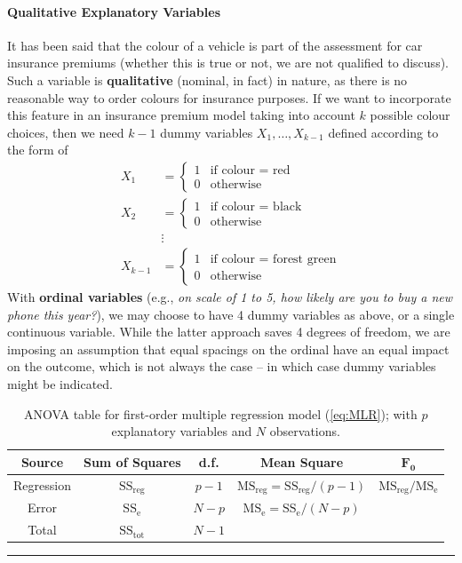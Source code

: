 \paragraph{Qualitative Explanatory Variables}
It has been said that the colour of a vehicle is part of the assessment for car insurance premiums (whether this is true or not, we are not qualified to discuss). Such a variable is \textbf{qualitative} (nominal, in fact) in nature, as there is no reasonable way to order colours for insurance purposes. If we want to incorporate this feature in an insurance premium model taking into account $k$ possible colour choices, then we need $k-1$ dummy variables $X_1,\ldots,X_{k-1}$ defined according to  the form of
\begin{align*}
    X_{1} &= 
    \begin{cases}
    1 & \text{if colour $=$ red}\\
    0 & \text{otherwise}
    \end{cases}\\
    X_{2} &= 
    \begin{cases}
    1 & \text{if colour $=$ black}\\
    0 & \text{otherwise}
    \end{cases}\\
    & \vdots\\
    X_{k-1} &= 
    \begin{cases}
    1 & \text{if colour $=$ forest green}\\
    0 & \text{otherwise}
    \end{cases}
\end{align*}
With \textbf{ordinal variables} (e.g., \textit{on scale of 1 to 5, how likely are you to buy a new phone this year?}), we may choose to have 4 dummy variables as above, or a single continuous variable. While the latter approach saves 4 degrees of freedom, we are imposing an assumption that equal spacings on the ordinal have an equal impact on the outcome, which is not always the case -- in which case dummy variables might be indicated.

     \begin{table}[!t]
         \centering
         \begin{tabular}{c c c c c}
         \hline
        \textbf{Source} & \textbf{Sum of Squares} & \textbf{d.f.} & \textbf{Mean Square} & $\mathbf{F_{0}}$ \\
         \hline
         Regression & $\text{SS}_{\textrm{reg}}$ & $p-1$ & $\text{MS}_{\textrm{reg}}=\text{SS}_{\textrm{reg}}/(p-1)$ & $\text{MS}_{\textrm{reg}}/\text{MS}_{\textrm{e}}$\\
         Error & $\text{SS}_{\textrm{e}}$ & $N-p$ & $\text{MS}_{\textrm{e}}=\text{SS}_{\textrm{e}}/(N-p)$ \\
         Total & $\text{SS}_{\textrm{tot}}$ & $N-1$\\
        \hline
         \end{tabular}
         \caption[\small ANOVA table for first-order multiple regression]{\small ANOVA table for first-order multiple regression model (\ref{eq:MLR}); with $p$ explanatory variables and $N$ observations. }
         \label{tab:SA4}\hrule
     \end{table}
